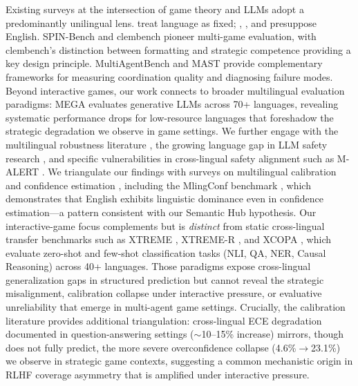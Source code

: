 \documentclass[11pt]{article}
\begin{document}
Existing surveys at the intersection of game theory and LLMs adopt a predominantly unilingual lens. \citet{sun2025gametheoryllm} treat language as fixed; \citet{zhang2024llmsurvey}, \citet{feng2024agents}, and \citet{hu2024gameagents} presuppose English. SPIN-Bench \citep{yao2025spinbench} and clembench \citep{chalamalasetti2023clembench, schlangen2025clembench} pioneer multi-game evaluation, with clembench's distinction between formatting and strategic competence providing a key design principle. MultiAgentBench \citep{nie2025multiagentbench} and MAST \citep{cemri2025mast} provide complementary frameworks for measuring coordination quality and diagnosing failure modes. Beyond interactive games, our work connects to broader multilingual evaluation paradigms: MEGA \citep{ahuja2023mega} evaluates generative LLMs across 70+ languages, revealing systematic performance drops for low-resource languages that foreshadow the strategic degradation we observe in game settings. We further engage with the multilingual robustness literature \citep{wang2024evaluating}, the growing language gap in LLM safety research \citep{yong2025multilingualsafety}, and specific vulnerabilities in cross-lingual safety alignment such as M-ALERT \citep{m-alert2025}. We triangulate our findings with surveys on multilingual calibration and confidence estimation \citep{calibration2024survey}, including the MlingConf benchmark \citep{xue2025mlingconf}, which demonstrates that English exhibits linguistic dominance even in confidence estimation---a pattern consistent with our Semantic Hub hypothesis. Our interactive-game focus complements but is \textit{distinct} from static cross-lingual transfer benchmarks such as XTREME \citep{hu2020xtreme}, XTREME-R \citep{ruder2021xtremer}, and XCOPA \citep{ponti2020xcopa}, which evaluate zero-shot and few-shot classification tasks (NLI, QA, NER, Causal Reasoning) across 40+ languages. Those paradigms expose cross-lingual generalization gaps in structured prediction but cannot reveal the strategic misalignment, calibration collapse under interactive pressure, or evaluative unreliability that emerge in multi-agent game settings. Crucially, the calibration literature provides additional triangulation: cross-lingual ECE degradation documented in question-answering settings ($\sim$10--15\% increase) \citep{calibration2024survey} mirrors, though does not fully predict, the more severe overconfidence collapse (4.6\%$\to$23.1\%) we observe in strategic game contexts, suggesting a common mechanistic origin in RLHF coverage asymmetry that is amplified under interactive pressure.
\end{document}
